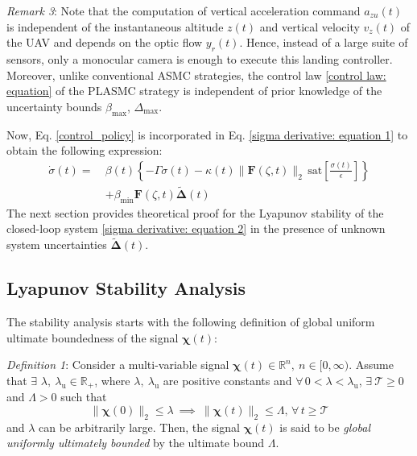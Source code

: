 \documentclass{IEEEtaes}
\begin{document}
\textit{Remark 3}: Note that the computation of vertical acceleration command $a_{zu}(t)$ is independent of the instantaneous altitude $z(t)$ and vertical velocity $v_z(t)$ of the UAV and depends on the optic flow $y_r(t)$.
Hence, instead of a large suite of sensors, only a monocular camera is enough to execute this landing controller.
Moreover, unlike conventional ASMC strategies, the control law \eqref{control law: equation} of the PLASMC strategy is independent of prior knowledge of the uncertainty bounds $\beta_{\text{max}}$, $\Delta_{\text{max}}$.

Now, Eq. \eqref{control_policy} is incorporated in Eq. \eqref{sigma derivative: equation 1} to obtain the following expression:
\begin{align}
\label{sigma derivative: equation 2}
\dot{\sigma}(t)=~&\beta(t) \left\{{-}\Gamma\sigma(t){-}\kappa(t) \lVert \boldsymbol{F}(\zeta,t) \rVert_2 \,\text{sat} \left[\frac{\sigma(t)}{\epsilon} \right]\right\}\nonumber\\
&+\beta_{\text{min}}\boldsymbol{F}(\zeta,t)\tilde{\boldsymbol{\Delta}}(t)
\end{align}
The next section provides theoretical proof for the Lyapunov stability of the closed-loop system \eqref{sigma derivative: equation 2} in the presence of unknown system uncertainties $\tilde{\boldsymbol{\Delta}}(t)$. 

\subsection{Lyapunov Stability Analysis}
The stability analysis starts with the following definition of global uniform ultimate boundedness of the signal $\boldsymbol{\chi}(t)$:

\textit{Definition 1}: \cite{li2022} Consider a multi-variable signal $\boldsymbol{\chi}(t) \in \mathbb{R}^n, ~n \in [0, \infty)$. Assume that $\exists$ $\lambda, ~ \lambda_{\text{u}} \in \mathbb{R}_+$, where $\lambda, ~ \lambda_{\text{u}}$ are positive constants and $\forall \, 0 < \lambda < \lambda_{\text{u}}$, $\exists ~ \mathcal{T} \geq 0$ and $\Lambda > 0$ such that
\begin{equation} \label{GUUB: Definition}
    \lVert \boldsymbol{\chi}(0) \rVert_2 \leq \lambda ~\implies~ \lVert \boldsymbol{\chi}(t) \rVert_2 \leq \Lambda,  \, \forall \, t \geq \mathcal{T}
\end{equation}
\noindent and $\lambda$ can be arbitrarily large. Then, the signal $\boldsymbol{\chi}(t)$ is said to be \textit{global uniformly ultimately bounded} by the ultimate bound $\Lambda$.
\end{document}
